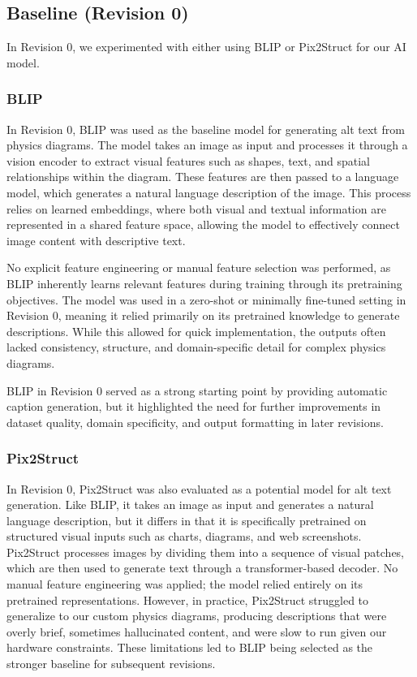 \documentclass[11pt]{article}
\begin{document}
\subsection{Baseline (Revision 0)}
In Revision 0, we experimented with either using BLIP or Pix2Struct for our AI model. 

\subsubsection{BLIP}
In Revision 0, BLIP was used as the baseline model for generating alt text from physics diagrams. The model takes an 
image as input and processes it through a vision encoder to extract visual features such as shapes, text, and spatial 
relationships within the diagram. These features are then passed to a language model, which generates a natural 
language description of the image. This process relies on learned embeddings, where both visual and textual information 
are represented in a shared feature space, allowing the model to effectively connect image content with descriptive text.

No explicit feature engineering or manual feature selection was performed, as BLIP inherently learns relevant features 
during training through its pretraining objectives. The model was used in a zero-shot or minimally fine-tuned setting 
in Revision 0, meaning it relied primarily on its pretrained knowledge to generate descriptions. While this allowed for 
quick implementation, the outputs often lacked consistency, structure, and domain-specific detail for complex physics diagrams.

BLIP in Revision 0 served as a strong starting point by providing automatic caption generation, but it highlighted 
the need for further improvements in dataset quality, domain specificity, and output formatting in later revisions.

\subsubsection{Pix2Struct}
In Revision 0, Pix2Struct was also evaluated as a potential model for alt text generation. 
Like BLIP, it takes an image as input and generates a natural language description, but 
it differs in that it is specifically pretrained on structured visual inputs such as 
charts, diagrams, and web screenshots. Pix2Struct processes images by dividing them into 
a sequence of visual patches, which are then used to generate text through a 
transformer-based decoder. No manual feature engineering was applied; the model relied 
entirely on its pretrained representations. However, in practice, Pix2Struct struggled 
to generalize to our custom physics diagrams, producing descriptions that were overly 
brief, sometimes hallucinated content, and were slow to run given our hardware constraints. 
These limitations led to BLIP being selected as the stronger baseline for subsequent revisions.
\end{document}
